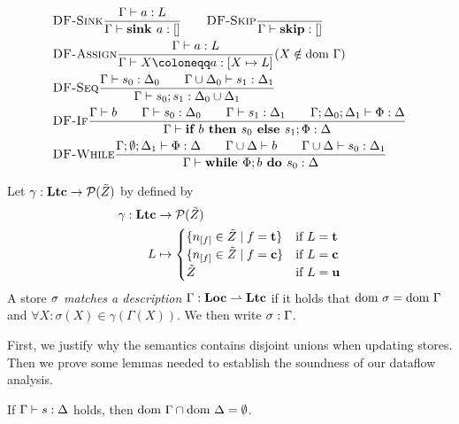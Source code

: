 \begin{align*}
    &\trule{DF-Sink}{\typestep{\Gamma}{a}{L}}{\typestep{\Gamma}{\sink{a}}{[]}}\qquad
    \trule{DF-Skip}{}{\typestep{\Gamma}{\skipcmd}{[]}}\\
    &\trule{DF-Assign}{\typestep{\Gamma}{a}{L}}
    {\typestep{\Gamma}{\defaultstore}{[X \mapsto L]}} \text{($X \notin \dom\Gamma$)}\\
    &\trule{DF-Seq}{\typestep{\Gamma}{s_0}{\Delta_0}\qquad
    \typestep{\Gamma \cup \Delta_0}{s_1}{\Delta_1}}{\typestep{\Gamma}{\defaultssaseq}{\Delta_0 \cup \Delta_1}}\\
    &\trule{DF-If}{\typestmt{\Gamma}{b}\qquad\typestep{\Gamma}{s_0}{\Delta_0}\qquad \typestep{\Gamma}{s_1}{\Delta_1}\qquad
    \typestep{\Gamma;\Delta_0;\Delta_1}{\philist}{\Delta}}
    {\typestep{\Gamma}{\defaultssaif}{\Delta}}\\
    &\trule{DF-While}{\typestep{\Gamma;\emptyset;\Delta_1}{\philist}{\Delta}\qquad
    \typestmt{\Gamma \cup \Delta}{b}\qquad\typestep{\Gamma \cup \Delta}{s_0}{\Delta_1}}
    {\typestep{\Gamma}{\defaultssawhile}{\Delta}}
\end{align*}

\begin{definition}
    Let $\gamma:\textbf{Ltc} \to \operatorname{\mathcal{P}}(\tilde{Z})$ by defined by
    \begin{align*}
        \gamma:\lattice &\to \P(\StoreDomain)\\
        L &\mapsto \begin{cases}
            \{\flagged{} \in \StoreDomain \mid f = \textbf{t}\} & \text{if }L = \ltracked\\
            \{\flagged{} \in \StoreDomain \mid  f = \textbf{c}\} & \text{if }L = \lclean\\
            \StoreDomain & \text{if }L = \lunknown\\
        \end{cases}
    \end{align*}
    A store $\sigma$ \emph{matches a description} $\Gamma: \textbf{Loc} \rightharpoonup \textbf{Ltc}$ if it holds that 
    $\text{dom }{\sigma} = \text{dom }{\Gamma}$ and $\forall X: \sigma(X) \in \gamma(\Gamma(X))$.
    We then write ${\sigma}:{\Gamma}$.
\end{definition}

First, we justify why the semantics contains disjoint unions when updating stores.
Then we prove some lemmas needed to establish the soundness of our dataflow analysis.
\begin{theorem}
    \label{thm:gamma-delta-disjoint}
    If $\Gamma \vdash {s}: \Delta$ holds, then $\text{dom }{\Gamma} \cap \text{dom }{\Delta} = \emptyset$.
\end{theorem}

